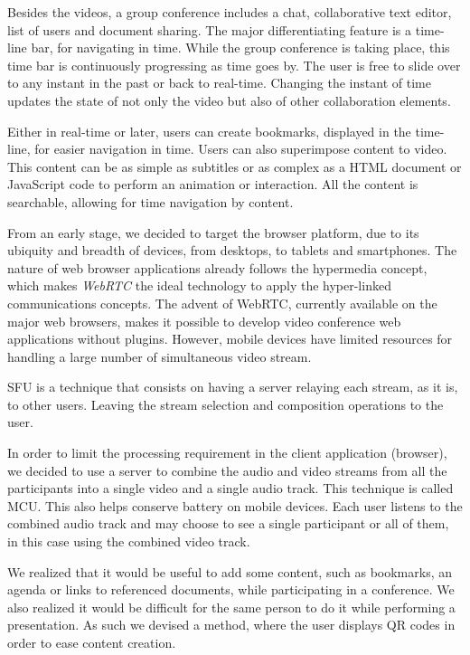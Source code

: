 \documentclass[10pt,conference]{IEEEtran}
\begin{document}
Besides the videos, a group conference includes a chat, collaborative text editor, list of users and document sharing.
The major differentiating feature is a time-line bar, for navigating in time.
While the group conference is taking place, this time bar is continuously progressing as time goes by.
The user is free to slide over to any instant in the past or back to real-time.
Changing the instant of time updates the state of not only the video but also of other collaboration elements. %

Either in real-time or later, users can create bookmarks, displayed in the time-line, for easier navigation in time.
Users can also superimpose content to video.
This content can be as simple as subtitles or as complex as a \gls{HTML} document or JavaScript code to perform an animation or interaction.
All the content is searchable, allowing for time navigation by content.

From an early stage, we decided to target the browser platform, due to its ubiquity and breadth of devices, from desktops, to tablets and smartphones.
The nature of web browser applications already follows the hypermedia concept, which makes \emph{WebRTC} the ideal technology to apply the hyper-linked communications concepts.
The advent of \gls{WebRTC}, currently available on the major web browsers, makes it possible to develop video conference web applications without plugins.
However, mobile devices have limited resources for handling a large number of simultaneous video stream.

\gls{SFU} is a technique that consists on having a server relaying each stream, as it is, to other users. Leaving the stream selection and composition operations to the user.

In order to limit the processing requirement in the client application (browser), we decided to use a server to combine the audio and video streams from all the participants into a single video and a single audio track. This technique is called \gls{MCU}.
This also helps conserve battery on mobile devices.
Each user listens to the combined audio track and may choose to see a single participant or all of them, in this case using the combined video track. 

We realized that it would be useful to add some content, such as bookmarks, an agenda or links to referenced documents, while participating in a conference.
We also realized it would be difficult for the same person to do it while performing a presentation.
As such we devised a method, where the user displays \gls{QR} codes in order to ease content creation.
\end{document}
